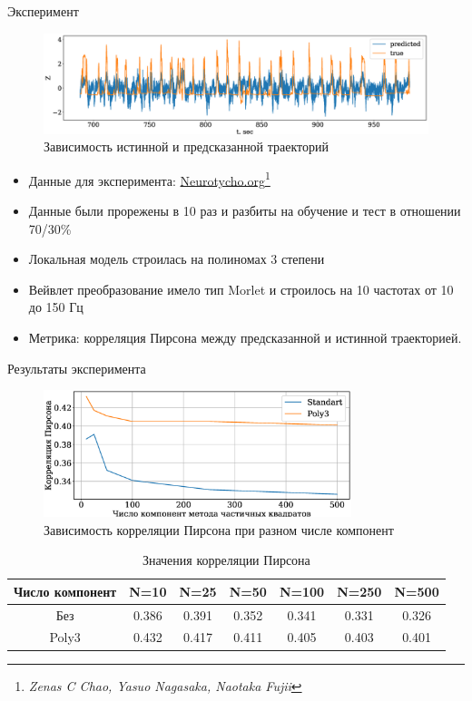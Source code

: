 \documentclass[9pt,pdf,hyperref={unicode}]{beamer}
\begin{document}
\begin{frame}{Эксперимент}
\begin{figure}
	\includegraphics[height=0.3\textheight]{figs/pre.eps}
	\caption{Зависимость истинной и предсказанной траекторий}
\end{figure}
\begin{itemize}
	\item Данные для эксперимента: \href{http://neurotycho.org/epidural-ecog-food-tracking-task}{Neurotycho.org}\footnote[2]{\textit{Zenas C Chao, Yasuo Nagasaka, Naotaka Fujii}} 
	\item Данные были прорежены в 10 раз и разбиты на обучение и тест в отношении 70/30\%
	\item Локальная модель строилась на полиномах 3 степени
	\item Вейвлет преобразование имело тип Morlet и строилось на 10 частотах от 10 до 150 Гц
	\item Метрика: корреляция Пирсона между предсказанной и истинной траекторией.
\end{itemize}
\end{frame}
\begin{frame}{Результаты эксперимента}
\begin{figure}
	\includegraphics[width=0.8\textwidth]{figs/com.eps}
	\caption{Зависимость корреляции Пирсона при разном числе компонент}
\end{figure}
\begin{table}[]
	\caption{Значения корреляции Пирсона}
	\begin{tabular}{|c|c|c|c|c|c|c|}
		\hline
		Число компонент & N=10  & N=25  & N=50  & N=100 & N=250 & N=500 \\ \hline
		Без             & 0.386 & 0.391 & 0.352 & 0.341 & 0.331 & 0.326 \\ \hline
		Poly3           & 0.432 & 0.417 & 0.411 & 0.405 & 0.403 & 0.401 \\ \hline
	\end{tabular}
\end{table}
\end{frame}
\end{document}
